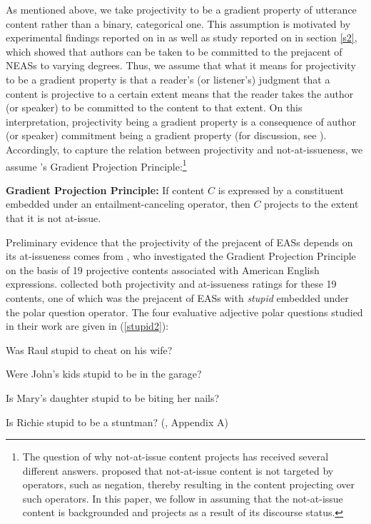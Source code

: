 \documentclass[11pt,fleqn]{article}
\newcommand{\6}{\mbox{$[\hspace*{-.6mm}[$}}
\newcommand{\9}{\mbox{$]\hspace*{-.6mm}]$}}
\newcommand{\citepos}[1]{\citeauthor{#1}'s \citeyear{#1}}
\begin{document}
As mentioned above, we take projectivity to be a gradient property of utterance content rather than a binary, categorical one. This assumption is motivated by experimental findings reported on in \citealt{tbd-variability} as well as study reported on in section \ref{s2}, which showed that authors can be taken to be committed to the prejacent of NEASs to varying degrees. Thus, we assume that what it means for projectivity to be a gradient property is that a reader's (or listener's) judgment that a content is projective to a certain extent means that the reader takes the author (or speaker) to be committed to the content to that extent. On this interpretation, projectivity being a gradient property is a consequence of author (or speaker) commitment being a gradient property (for discussion, see \citealt{tbd-variability}). Accordingly, to capture the relation between projectivity and not-at-issueness, we assume \citepos{tbd-variability} Gradient Projection Principle:\footnote{The question of why not-at-issue content projects has received several different answers. \citet{brst-salt10} proposed that not-at-issue content is not targeted by operators, such as negation, thereby resulting in the content projecting over such operators. In this paper, we follow \citet{abrusan2011} in assuming that the not-at-issue content is backgrounded and projects as a result of its discourse status.}

\begin{exe}
\ex\label{gpp} {\bf Gradient Projection Principle:} If content $C$ is expressed by a constituent embedded under an entailment-canceling operator, then $C$ projects to the 
extent that it is not at-issue.

\end{exe}

Preliminary evidence that the projectivity of the prejacent of EASs depends on its at-issueness comes from \citealt{tbd-variability}, who investigated the Gradient Projection Principle on the basis of 19 projective contents associated with American English expressions. \citet{tbd-variability} collected both projectivity and at-issueness ratings for these 19 contents, one of which was the prejacent of EASs with {\em stupid} embedded under the polar question operator. The four evaluative adjective polar questions studied in their work are given in (\ref{stupid2}):

\begin{exe}
\ex\label{stupid2}

\begin{xlist}

\ex Was Raul stupid to cheat on his wife?

\ex Were John's kids stupid to be in the garage?

\ex Is Mary's daughter stupid to be biting her nails?

\ex Is Richie stupid to be a stuntman? \hfill (\citealt{tbd-variability}, Appendix A)

\end{xlist}

\end{exe}
\end{document}
